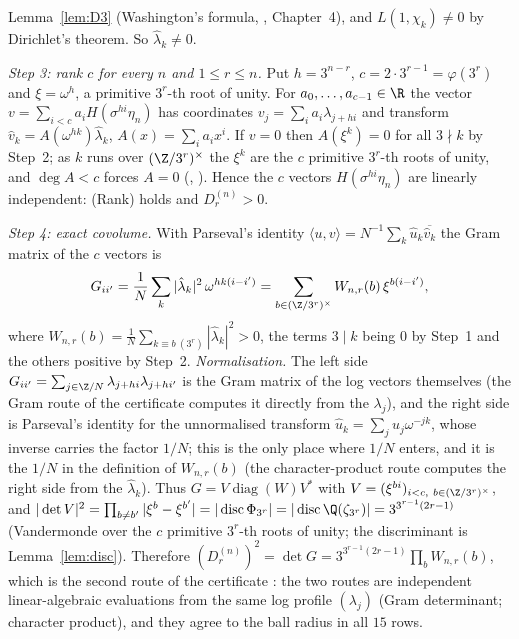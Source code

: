 Lemma~\ref{lem:D3} (Washington's formula, \cite{Wash}, Chapter~4), and $L(1,\chi_k)\ne0$ by Dirichlet's theorem. So $\hat\lambda_k\ne0$.

\emph{Step 3: rank $c$ for every $n$ and $1\le r\le n$.} Put $h=3^{n-r}$, $c=2\cdot3^{r-1}=\varphi(3^r)$ and $\xi=\omega^{h}$, a primitive $3^r$-th root of unity. For $a_0,\dots,a_{c-1}\in\R$ the vector $v=\sum_{i<c}a_iH(\sigma^{hi}\eta_n)$ has coordinates $v_j=\sum_ia_i\lambda_{j+hi}$ and transform $\hat v_k=A(\omega^{hk})\hat\lambda_k$, $A(x)=\sum_ia_ix^i$. If $v=0$ then $A(\xi^{k})=0$ for all $3\nmid k$ by Step~2; as $k$ runs over $(\Z/3^r)^\times$ the $\xi^k$ are the $c$ primitive $3^r$-th roots of unity, and $\deg A<c$ forces $A=0$ (, ). Hence the $c$ vectors $H(\sigma^{hi}\eta_n)$ are linearly independent: (Rank) holds and $D_r^{(n)}>0$.

\emph{Step 4: exact covolume.} With Parseval's identity $\langle u,v\rangle=N^{-1}\sum_k\hat u_k\overline{\hat v_k}$ the Gram matrix of the $c$ vectors is
\[ G_{ii'}=\frac1N\sum_{k}|\hat\lambda_k|^2\,\omega^{hk(i-i')}=\sum_{b\in(\Z/3^r)^\times}W_{n,r}(b)\,\xi^{b(i-i')},\] where $W_{n,r}(b)=\frac1N\sum_{k\equiv b\ (3^r)}|\hat\lambda_k|^2>0$,
the terms $3\mid k$ being $0$ by Step~1 and the others positive by Step~2. \emph{Normalisation.} The left side $G_{ii'}=\sum_{j\in\Z/N}\lambda_{j+hi}\lambda_{j+hi'}$ is the Gram matrix of the log vectors themselves (the Gram route of the certificate computes it directly from the $\lambda_j$), and the right side is Parseval's identity for the unnormalised transform $\hat u_k=\sum_j u_j\omega^{-jk}$, whose inverse carries the factor $1/N$; this is the only place where $1/N$ enters, and it is the $1/N$ in the definition of $W_{n,r}(b)$ (the character-product route computes the right side from the $\hat\lambda_k$). Thus $G=V\operatorname{diag}(W)V^{*}$ with $V=(\xi^{bi})_{i<c,\ b\in(\Z/3^r)^\times}$, and $|\det V|^2=\prod_{b\ne b'}|\xi^{b}-\xi^{b'}|=|\operatorname{disc}\Phi_{3^r}|=|\operatorname{disc}\Q(\zeta_{3^r})|=3^{3^{r-1}(2r-1)}$ (Vandermonde over the $c$ primitive $3^r$-th roots of unity; the discriminant is Lemma~\ref{lem:disc}). Therefore $(D_r^{(n)})^2=\det G=3^{3^{r-1}(2r-1)}\prod_{b}W_{n,r}(b)$, which is the second route of the certificate \artPcert{}: the two routes are independent linear-algebraic evaluations from the same log profile $(\lambda_j)$ (Gram determinant; character product), and they agree to the ball radius in all $15$ rows.
